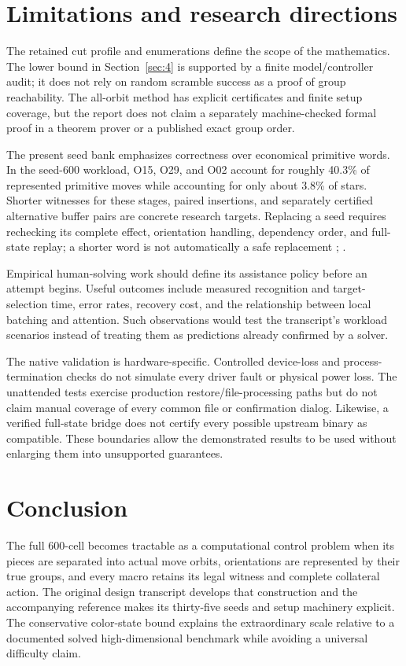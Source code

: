 \documentclass[a4paper,11pt]{article}
\begin{document}
\section{Limitations and research directions}
\label{sec:9}

The retained cut profile and enumerations define the scope of the mathematics. The lower bound in Section~\ref{sec:4} is supported by a finite model/controller audit; it does not rely on random scramble success as a proof of group reachability. The all-orbit method has explicit certificates and finite setup coverage, but the report does not claim a separately machine-checked formal proof in a theorem prover or a published exact group order.

The present seed bank emphasizes correctness over economical primitive words. In the seed-600 workload, O15, O29, and O02 account for roughly 40.3\% of represented primitive moves while accounting for only about 3.8\% of stars. Shorter witnesses for these stages, paired insertions, and separately certified alternative buffer pairs are concrete research targets. Replacing a seed requires rechecking its complete effect, orientation handling, dependency order, and full-state replay; a shorter word is not automatically a safe replacement \cite[p.~31]{transcript}; \cite{algorithms}.

Empirical human-solving work should define its assistance policy before an attempt begins. Useful outcomes include measured recognition and target-selection time, error rates, recovery cost, and the relationship between local batching and attention. Such observations would test the transcript's workload scenarios instead of treating them as predictions already confirmed by a solver.

The native validation is hardware-specific. Controlled device-loss and process-termination checks do not simulate every driver fault or physical power loss. The unattended tests exercise production restore/file-processing paths but do not claim manual coverage of every common file or confirmation dialog. Likewise, a verified full-state bridge does not certify every possible upstream binary as compatible. These boundaries allow the demonstrated results to be used without enlarging them into unsupported guarantees.

\section{Conclusion}
\label{sec:10}

The full 600-cell becomes tractable as a computational control problem when its pieces are separated into actual move orbits, orientations are represented by their true groups, and every macro retains its legal witness and complete collateral action. The original design transcript develops that construction and the accompanying reference makes its thirty-five seeds and setup machinery explicit. The conservative color-state bound explains the extraordinary scale relative to a documented solved high-dimensional benchmark while avoiding a universal difficulty claim.
\end{document}
